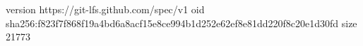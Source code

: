 version https://git-lfs.github.com/spec/v1
oid sha256:f823f7f868f19a4bd6a8acf15e8ce994b1d252e62ef8e81dd220f8c20e1d30fd
size 21773
